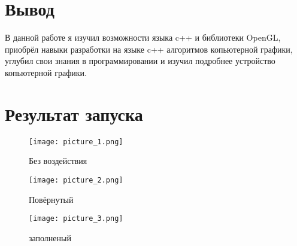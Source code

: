 \documentclass[a4paper, 14pt]{extarticle}
\begin{document}
\section{Вывод}

В данной работе я изучил возможности языка c++ и библиотеки OpenGL, приобрёл навыки разработки на языке c++ алгоритмов копьютерной графики, углубил свои знания в  программировании и изучил подробнее устройство копьютерной графики. 


\section{Результат запуска}
    
\begin{figure}[!htb]
	\centering
	\texttt{[image: picture\_1.png]}
\caption{Без воздействия}
\label{fig:picture_1.png}
\end{figure}

\begin{figure}[!htb]
	\centering
	\texttt{[image: picture\_2.png]}
\caption{Повёрнутый}
\label{fig:picture_2.png}
\end{figure}

\begin{figure}[!htb]
	\centering
	\texttt{[image: picture\_3.png]}
\caption{заполненый}
\label{fig:picture_3.png}
\end{figure}
\end{document}

